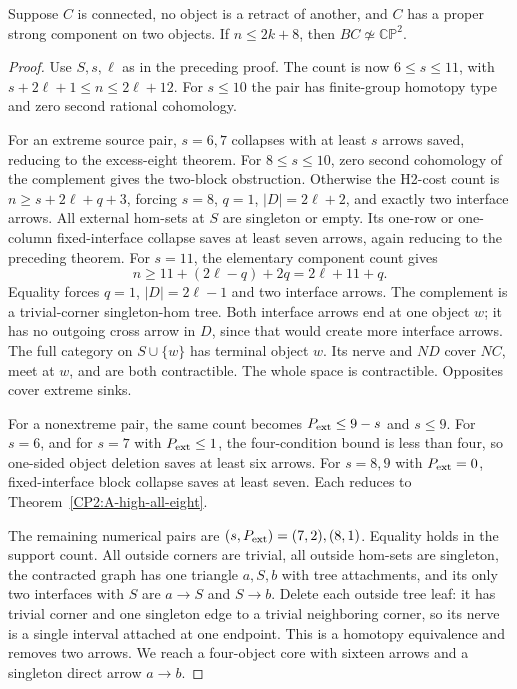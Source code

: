 \begin{proposition}
\label{CP2:A-high-pair-nine}
Suppose $C$ is connected, no object is a retract of
another, and $C$ has a proper strong component on two
objects.  If $n\leq2k+8$, then
$BC\not\simeq\mathbb{CP}^2$.
\end{proposition}
\begin{proof}
Use $S,s,\ell$ as in the preceding proof.  The count
is now $6\leq s\leq11$, with
$s+2\ell+1\leq n\leq2\ell+12$.  For $s\leq10$
the pair has finite-group homotopy type and zero
second rational cohomology.

For an extreme source pair, $s=6,7$ collapses with
at least $s$ arrows saved, reducing to the excess-eight
theorem.  For $8\leq s\leq10$, zero second cohomology
of the complement gives the two-block obstruction.
Otherwise the H2-cost count is
$n\geq s+2\ell+q+3$, forcing
$s=8$, $q=1$, $|D|=2\ell+2$, and exactly two
interface arrows.  All external hom-sets at $S$ are
singleton or empty.  Its one-row or one-column
fixed-interface collapse saves at least seven arrows,
again reducing to the preceding theorem.
For $s=11$, the elementary component count gives
\[
 n\geq11+(2\ell-q)+2q=2\ell+11+q.
\]
Equality forces $q=1$, $|D|=2\ell-1$ and two
interface arrows.  The complement is a trivial-corner
singleton-hom tree.  Both interface arrows end at
one object $w$; it has no outgoing cross arrow in
$D$, since that would create more interface arrows.
The full category on $S\cup\{w\}$ has terminal
object $w$.  Its nerve and $ND$ cover $NC$, meet
at $w$, and are both contractible.  The whole space
is contractible.  Opposites cover extreme sinks.

For a nonextreme pair, the same count becomes
$P_{\rm ext}\leq9-s$ and $s\leq9$.
For $s=6$, and for $s=7$ with $P_{\rm ext}\leq1$,
the four-condition bound is less than four, so
one-sided object deletion saves at least six arrows.
For $s=8,9$ with $P_{\rm ext}=0$, fixed-interface
block collapse saves at least seven.  Each reduces
to Theorem~\ref{CP2:A-high-all-eight}.

The remaining numerical pairs are
$(s,P_{\rm ext})=(7,2),(8,1)$.  Equality holds
in the support count.  All outside corners are
trivial, all outside hom-sets are singleton, the
contracted graph has one triangle $a,S,b$ with
tree attachments, and its only two interfaces with
$S$ are $a\to S$ and $S\to b$.  Delete each outside
tree leaf: it has trivial corner and one singleton
edge to a trivial neighboring corner, so its nerve
is a single interval attached at one endpoint.
This is a homotopy equivalence and removes two
arrows.  We reach a four-object core with sixteen
arrows and a singleton direct arrow $a\to b$.


\end{proof}
